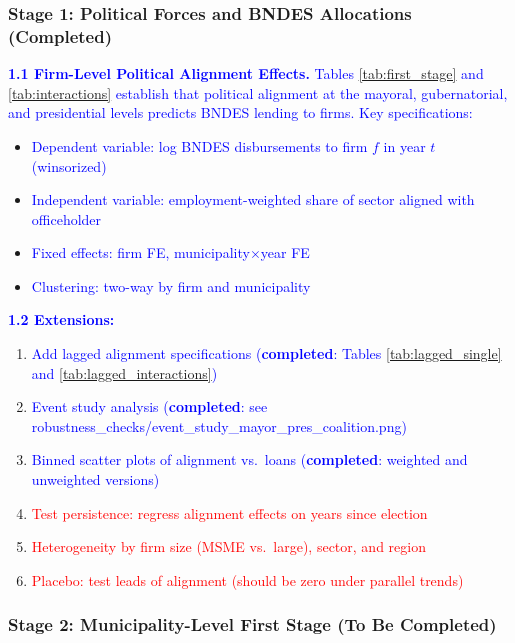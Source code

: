 \documentclass{article}
\begin{document}
\subsubsection*{Stage 1: Political Forces and BNDES Allocations (Completed)}

\textcolor{blue}{\textbf{1.1 Firm-Level Political Alignment Effects.} Tables \ref{tab:first_stage} and \ref{tab:interactions} establish that political alignment at the mayoral, gubernatorial, and presidential levels predicts BNDES lending to firms. Key specifications:}
\begin{itemize}
    \item \textcolor{blue}{Dependent variable: log BNDES disbursements to firm $f$ in year $t$ (winsorized)}
    \item \textcolor{blue}{Independent variable: employment-weighted share of sector aligned with officeholder}
    \item \textcolor{blue}{Fixed effects: firm FE, municipality$\times$year FE}
    \item \textcolor{blue}{Clustering: two-way by firm and municipality}
\end{itemize}

\textcolor{blue}{\textbf{1.2 Extensions:}}
\begin{enumerate}
    \item \textcolor{blue}{Add lagged alignment specifications (\textbf{completed}: Tables \ref{tab:lagged_single} and \ref{tab:lagged_interactions})}
    \item \textcolor{blue}{Event study analysis (\textbf{completed}: see robustness\_checks/event\_study\_mayor\_pres\_coalition.png)}
    \item \textcolor{blue}{Binned scatter plots of alignment vs.~loans (\textbf{completed}: weighted and unweighted versions)}
    \item \textcolor{red}{Test persistence: regress alignment effects on years since election}
    \item \textcolor{red}{Heterogeneity by firm size (MSME vs.~large), sector, and region}
    \item \textcolor{red}{Placebo: test leads of alignment (should be zero under parallel trends)}
\end{enumerate}

\subsubsection*{Stage 2: Municipality-Level First Stage (To Be Completed)}
\end{document}
